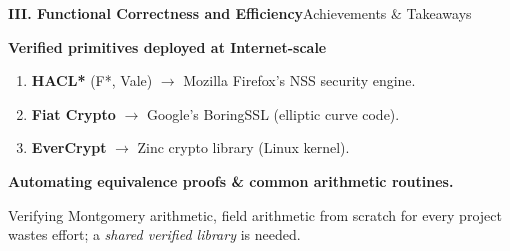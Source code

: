 \documentclass[10pt,aspectratio=1610,compress,dvipsnames]{beamer}
\begin{document}
\begin{frame}[fragile]{\bfseries III. Functional Correctness and Efficiency}{Achievements \& Takeaways}
\begin{description}[style=nextline]
	\item[{\color{cseblue}\bfseries Achievements}] \textbf{Verified primitives deployed at Internet-scale}
\end{description}
\begin{enumerate}[$\bullet$]
	\item \textbf{HACL*} (F*, Vale) $\to$ Mozilla Firefox's NSS security engine.
	\item \textbf{Fiat Crypto} $\to$ Google's BoringSSL (elliptic curve code).
	\item \textbf{EverCrypt} $\to$ Zinc crypto library (Linux kernel).
\end{enumerate}
\medskip
\begin{description}[style=nextline]
	\item[{\color{cseblue}\bfseries Challenge}] \textbf{Automating equivalence proofs \& common arithmetic routines.}
	\item[$\to$] Verifying Montgomery arithmetic, field arithmetic from scratch for every project wastes effort; a \emph{shared verified library} is needed.
\end{description}
\end{frame}

\end{document}
